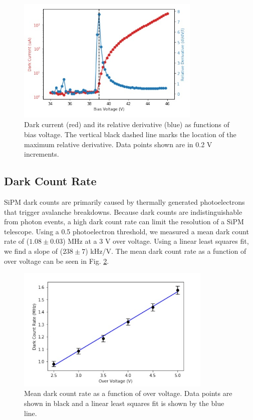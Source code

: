 \documentclass{article}
\begin{document}
\begin{figure}[ht]
    \centering     
    \includegraphics[height=6cm]{images/figura3.jpg}
    
    \caption{Dark current (red) and its relative derivative (blue) as functions of bias voltage. The vertical black dashed line marks the location of the maximum relative derivative. Data points shown are in 0.2 V increments.}
    \label{fig:BiasVoltage}
    
\end{figure}


\subsection{Dark Count Rate}
SiPM dark counts are primarily caused by thermally generated photoelectrons that trigger avalanche breakdowns. Because dark counts are indistinguishable from photon events, a high dark count rate can limit the resolution of a SiPM telescope. Using a 0.5 photoelectron threshold, we measured a mean dark count rate of ($1.08 \pm 0.03$) MHz at a 3 V over voltage. Using a linear least squares fit, we find a slope of ($238 \pm 7$) kHz/V. The mean dark count rate as a function of over voltage can be seen in Fig. \ref{fig:BiasVoltage2}.

\begin{figure}[ht]
    \centering     
    \includegraphics[height=6cm]{images/figura4.jpg}
    
    \caption{Mean dark count rate as a function of over voltage. Data points are shown in black and a linear least squares
    fit is shown by the blue line.}
    \label{fig:BiasVoltage2}
    
\end{figure}
\end{document}
